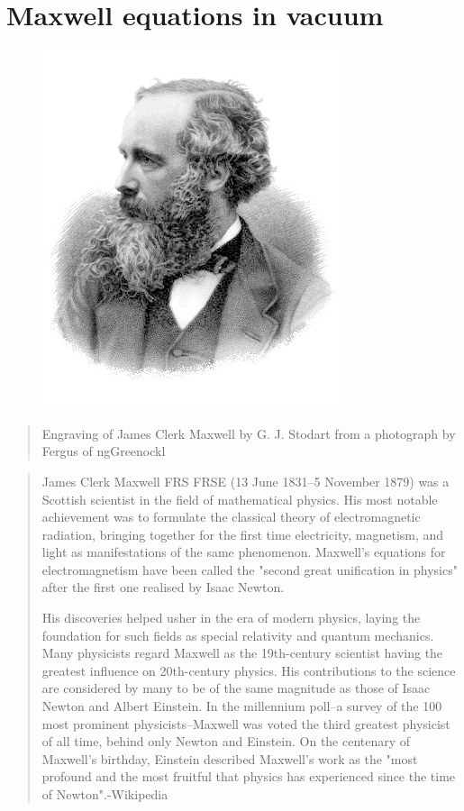 \chapter{Maxwell equations in vacuum}


\newpage
\begin{figure}[H]
\centering
\includegraphics[scale=.3]{src/images/lbk-graphics/portraits/maxwell-wiki.png}
\caption*{}
\end{figure}

\begin{quote}Engraving of James Clerk
Maxwell by  G. J. Stodart from a photograph by Fergus of
ngGreenockl
\end{quote}


\begin{small}
\begin{quote}

James Clerk Maxwell FRS FRSE (13 June 1831--5 November 1879) 
was a Scottish  scientist in the field of mathematical 
physics.  His most notable achievement was to formulate the 
classical theory of electromagnetic radiation, bringing 
together for the first time electricity, magnetism, and 
light as manifestations of the same phenomenon.  Maxwell's 
equations for electromagnetism have   been called the 
"second great unification in   physics"  after the first one 
realised by Isaac Newton.

His discoveries helped usher in the era of modern physics, 
laying the foundation for such fields as special relativity 
and quantum mechanics. Many physicists regard Maxwell as 
the  19th-century  scientist having the greatest 
influence on  20th-century physics. His contributions to 
the  science are considered by many to be of the same 
magnitude as those of Isaac Newton and Albert Einstein. In 
the millennium poll--a survey of the 100 most prominent 
physicists--Maxwell was  voted the third greatest 
physicist of all time, behind only Newton and Einstein. On 
the centenary of Maxwell's birthday, Einstein described  
Maxwell's work as the "most profound and the  most 
fruitful that physics has experienced since  the time of 
Newton".\hfill-Wikipedia
\end{quote}
\end{small}

